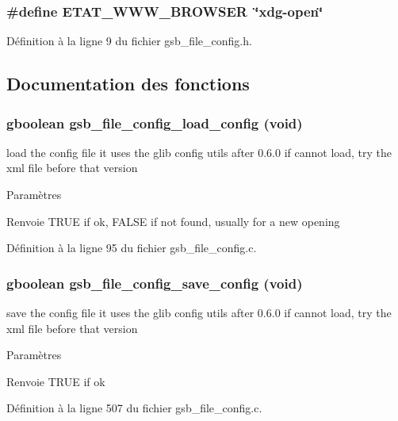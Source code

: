 \subsubsection[{ETAT\_\-WWW\_\-BROWSER}]{\setlength{\rightskip}{0pt plus 5cm}\#define ETAT\_\-WWW\_\-BROWSER~\char`\"{}xdg-\/open\char`\"{}}\label{gsb__file__config_8h_a969a4381d13ee5abf62a77b688bd9d8a}


Définition à la ligne 9 du fichier gsb\_\-file\_\-config.h.



\subsection{Documentation des fonctions}
\subsubsection[{gsb\_\-file\_\-config\_\-load\_\-config}]{\setlength{\rightskip}{0pt plus 5cm}gboolean gsb\_\-file\_\-config\_\-load\_\-config (void)}\label{gsb__file__config_8h_a75e81d75a401a5e21644fd1e61a3d32f}
load the config file it uses the glib config utils after 0.6.0 if cannot load, try the xml file before that version


\begin{DoxyParams}{Paramètres}
\item[{\em }]\end{DoxyParams}
\begin{DoxyReturn}{Renvoie}
TRUE if ok, FALSE if not found, usually for a new opening 
\end{DoxyReturn}


Définition à la ligne 95 du fichier gsb\_\-file\_\-config.c.

\subsubsection[{gsb\_\-file\_\-config\_\-save\_\-config}]{\setlength{\rightskip}{0pt plus 5cm}gboolean gsb\_\-file\_\-config\_\-save\_\-config (void)}\label{gsb__file__config_8h_a74fd03c5b1ed804d94add079eca960fa}
save the config file it uses the glib config utils after 0.6.0 if cannot load, try the xml file before that version


\begin{DoxyParams}{Paramètres}
\item[{\em }]\end{DoxyParams}
\begin{DoxyReturn}{Renvoie}
TRUE if ok 
\end{DoxyReturn}


Définition à la ligne 507 du fichier gsb\_\-file\_\-config.c.

